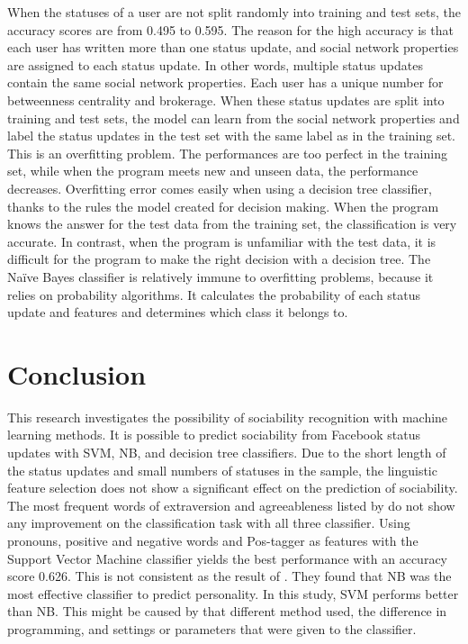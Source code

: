 \documentclass[
10pt, %
a4paper, %
oneside, %
headinclude,footinclude, %
] {book}%
\begin{document}
When the statuses of a user are not split randomly into training and test sets, the accuracy scores are from 0.495 to 0.595. The reason for the high accuracy is that each user has written more than one status update, and social network properties are assigned to each status update. In other words, multiple status updates contain the same social network properties. Each user has a unique number for betweenness centrality and brokerage. When these status updates are split into training and test sets, the model can learn from the social network properties and label the status updates in the test set with the same label as in the training set. This is an overfitting problem. The performances are too perfect in the training set, while when the program meets new and unseen data, the performance decreases. Overfitting error comes easily when using a decision tree classifier, thanks to the rules the model created for decision making. When the program knows the answer for the test data from the training set, the classification is very accurate. In contrast, when the program is unfamiliar with the test data, it is difficult for the program to make the right decision with a decision tree. The Naïve Bayes classifier is relatively immune to overfitting problems, because it relies on probability algorithms. It calculates the probability of each status update and features and determines which class it belongs to.



\chapter{Conclusion}

This research investigates the possibility of sociability recognition with machine learning methods. It is possible to predict sociability from Facebook status updates with SVM, NB, and decision tree classifiers. Due to the short length of the status updates and small numbers of statuses in the sample, the linguistic feature selection does not show a significant effect on the prediction of sociability. The most frequent words of extraversion and agreeableness listed by \citet{yarkoni2010personality} do not show any improvement on the classification task with all three classifier. Using pronouns, positive and negative words and Pos-tagger as features with the Support Vector Machine classifier yields the best performance with an accuracy score 0.626. This is not consistent as the result of \citet{alam2013personality}. They found that NB was the most effective classifier to predict personality. In this study, SVM performs better than NB. This might be caused by that different method used, the difference in programming, and settings or parameters that were given to the classifier.
\end{document}
